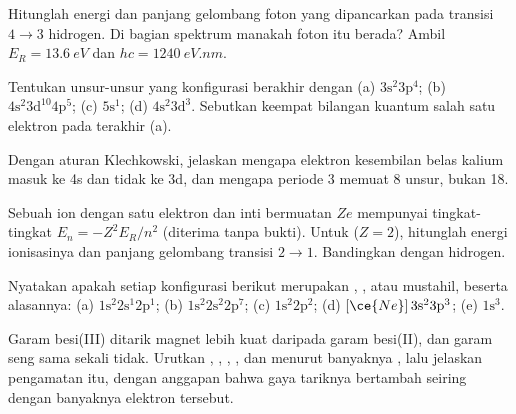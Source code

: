 \begin{exercise}[$\star\star$]\label{exo:b1:quantum-numbers:7}
Hitunglah energi dan panjang gelombang foton yang dipancarkan pada
transisi $4 \to 3$ hidrogen. Di bagian spektrum manakah foton itu berada?
Ambil $E_R = \qty{13.6}{eV}$ dan $hc = \qty{1240}{eV.nm}$.
\end{exercise}

\begin{exercise}[$\star\star$]\label{exo:b1:quantum-numbers:8}
Tentukan unsur-unsur yang konfigurasi  berakhir dengan
(a) $3\text{s}^2 3\text{p}^4$; (b) $4\text{s}^2 3\text{d}^{10} 4\text{p}^5$;
(c) $5\text{s}^1$; (d) $4\text{s}^2 3\text{d}^3$. Sebutkan keempat
bilangan kuantum salah satu elektron pada  terakhir (a).
\end{exercise}

\begin{exercise}[$\star\star$]\label{exo:b1:quantum-numbers:9}
Dengan aturan Klechkowski, jelaskan mengapa elektron kesembilan belas
kalium masuk ke 4s dan tidak ke 3d, dan mengapa periode 3 memuat 8 unsur,
bukan 18.
\end{exercise}

\begin{exercise}[$\star\star\star$]\label{exo:b1:quantum-numbers:10}
Sebuah ion dengan satu elektron dan inti bermuatan $Ze$ mempunyai
tingkat-tingkat $E_n = -Z^2 E_R/n^2$ (diterima tanpa bukti). Untuk
 ($Z = 2$), hitunglah energi ionisasinya dan panjang gelombang
transisi $2 \to 1$. Bandingkan dengan hidrogen.
\end{exercise}

\begin{exercise}[$\star\star\star$]\label{exo:b1:quantum-numbers:11}
Nyatakan apakah setiap konfigurasi berikut merupakan ,
, atau mustahil, beserta alasannya:
(a) $1\text{s}^2 2\text{s}^1 2\text{p}^1$;
(b) $1\text{s}^2 2\text{s}^2 2\text{p}^7$; (c) $1\text{s}^2 2\text{p}^2$;
(d) $[\ce{Ne}]\,3\text{s}^2 3\text{p}^3$; (e) $1\text{s}^3$.
\end{exercise}

\begin{exercise}[$\star\star\star$]\label{exo:b1:quantum-numbers:12}
Garam besi(III) ditarik magnet lebih kuat daripada garam besi(II), dan
garam seng sama sekali tidak. Urutkan , ,
, , dan  menurut banyaknya , lalu jelaskan pengamatan itu, dengan anggapan bahwa
gaya tariknya bertambah seiring dengan banyaknya elektron tersebut.
\end{exercise}

